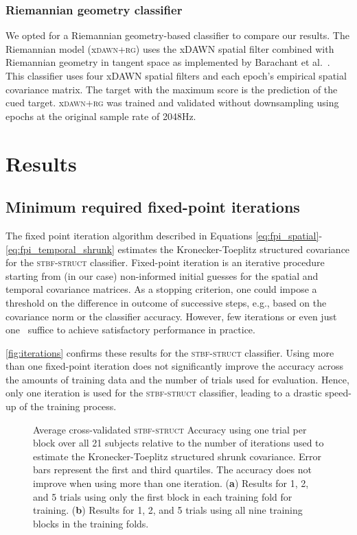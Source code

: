\begin{refsection}
	\subsubsection{Riemannian geometry classifier}
	\label{sec:riemannian}
	We opted for a Riemannian
	geometry-based classifier to compare our results.
	The Riemannian model (x\textsc{dawn+rg}) uses the xDAWN spatial filter combined
	with Riemannian geometry in tangent space as implemented by Barachant et
	al.~\cite{Barachant2014a}.
	This classifier uses four xDAWN spatial filters and each epoch's empirical spatial covariance matrix.
	The target with the maximum score is the prediction of the cued target.
	x\textsc{dawn+rg} was trained and validated without downsampling using epochs
	at the original sample rate of 2048Hz.

	\section{Results}
	\subsection{Minimum required fixed-point iterations}
	The fixed point iteration algorithm described
	in Equations \ref{eq:fpi_spatial}-\ref{eq:fpi_temporal_shrunk} estimates the Kronecker-Toeplitz structured covariance for the
	\textsc{stbf-struct} classifier.
	Fixed-point iteration is an iterative procedure starting from (in our case)
	non-informed initial guesses for the spatial and temporal covariance matrices.
	As a stopping criterion, one could impose a threshold on the difference in
	outcome of successive steps, e.g., based on the covariance norm or the
	classifier accuracy.
	However, few iterations or even just one~\cite{castaneda2014estimation} suffice to achieve satisfactory performance in practice.

	\autoref{fig:iterations} confirms these results for the \textsc{stbf-struct} classifier.
	Using more than one fixed-point iteration does not significantly improve the
	accuracy across the amounts of training data and the number of trials
	used for evaluation.
	Hence, only one iteration is used for the \textsc{stbf-struct} classifier, leading to a drastic speed-up of
	the training process.

	\begin{figure}
		\caption{Average cross-validated \textsc{stbf-struct} Accuracy using
			one trial per block over all 21 subjects
			relative to the number of iterations used to estimate the Kronecker-Toeplitz structured shrunk
			covariance. Error bars represent the first and third quartiles. The
			accuracy does not improve when using more than one iteration.
			(\textbf{a}) Results for 1, 2, and 5 trials using only the first block in each
			training fold for training. (\textbf{b}) Results
			for 1, 2, and 5 trials using
			all nine training blocks in the training folds.
		}
		\label{fig:iterations}
	\end{figure}


\end{refsection}
